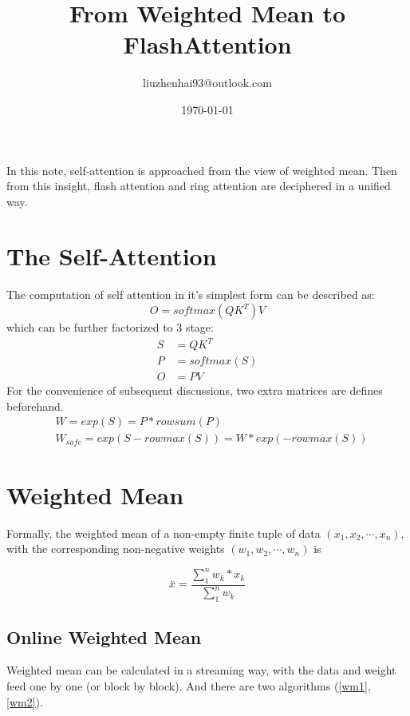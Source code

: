 \documentclass[a4paper]{article}
\title{From Weighted Mean to FlashAttention}
\author{liuzhenhai93@outlook.com}
\date{\today}
\begin{document}
    \maketitle

    In this note, self-attention is approached from the view of weighted mean. Then from this insight, flash attention and ring attention are deciphered in a unified way.

    \section{The Self-Attention}
    \par
    The computation of self attention in it's simplest form can be described as: \newline
    \begin{equation}
        O = softmax(QK^T)V
    \end{equation}
    which can be further factorized to 3 stage: \newline
    \begin{align}
        S &= QK^T \\
        P &= softmax(S) \\
        O &= PV
    \end{align}
    For the convenience of subsequent discussions, two extra matrices are defines beforehand.
    \newline
    \begin{align}
        & W = exp(S) = P* rowsum(P) \\
        & W_{safe} = exp(S-rowmax(S)) = W * exp(-rowmax(S))
    \end{align}


    \section{Weighted Mean}

    Formally, the weighted mean of a non-empty finite tuple of data $(x_1, x_2, \cdots, x_n)$, with the corresponding non-negative weights $(w_1, w_2, \cdots, w_n)$ is \newline

    \begin{equation}
        \bar{x} = \frac{\sum_{1}^{n} w_k*x_k}{\sum_{1}^{n}w_{k}}
    \end{equation}

    \subsection{Online Weighted Mean}
    Weighted mean can be calculated in a streaming way, with the data and weight feed one by one (or block by block).  And there are two algorithms (\ref{wm1}, \ref{wm2}).
\end{document}
